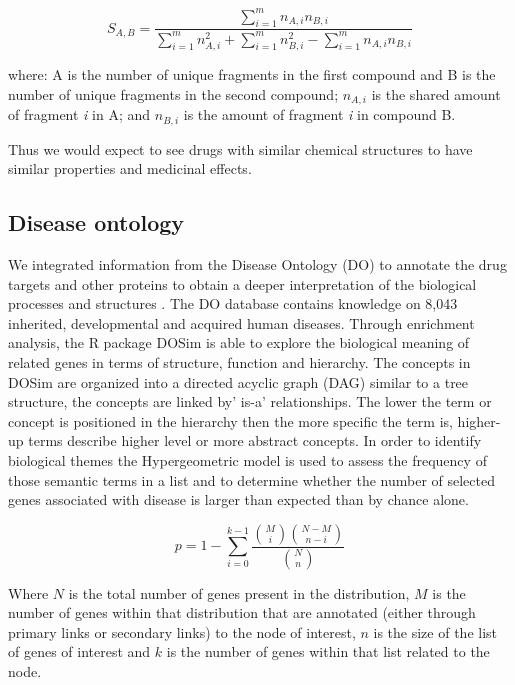 \documentclass[preprint,11pt]{elsarticle}
\begin{document}
\begin{equation}\label{tanimoto}
     S_{A,B}  =  \frac{\sum\limits_{i=1}^m n_{A,i} n_{B,i}}{\sum\limits_{i=1}^m  n_{A,i}^2+ \sum\limits_{i=1}^m n_{B,i}^2 - \sum\limits_{i=1}^m n_{A,i} n_{B,i}}  
\end{equation}

where: A is the number of unique fragments in the first compound and B is the number of unique fragments in the second compound; $ n_{A,i} $ is the shared amount of fragment  {\it i} in A; and $ n_{B,i} $ is the amount of fragment {\it i} in compound B.

Thus we would expect to see drugs with similar chemical structures to have similar properties and medicinal effects.

\subsection{Disease ontology}
We integrated information from the Disease Ontology (DO)   to annotate the drug targets and other proteins to obtain a deeper interpretation of the biological processes and structures \cite{Yu2010,Jiang2011,Schriml2012}. The DO database contains knowledge on 8,043 inherited, developmental and acquired human diseases. Through enrichment analysis, the R package  DOSim is able to explore the biological meaning of related genes in terms of structure, function and hierarchy. The concepts in DOSim are organized into a directed acyclic graph (DAG) similar to a tree structure, the concepts are linked by' is-a' relationships. The lower the term or concept is positioned in the hierarchy then the more specific the term is, higher-up terms describe higher level or more abstract concepts. In order to identify biological themes the Hypergeometric model is used to assess the frequency of those semantic terms
in a list and to determine whether the number of selected genes associated with disease is larger than expected than by chance alone.

\begin{equation}
        p = 1 - \displaystyle\sum_{i = 0}^{k-1}\frac{{M \choose i}{{N-M} \choose {n-i}}} {{N \choose n}}
\label{doe}
\end{equation}

Where $N$ is the total number of genes present in the distribution, $M$ is the number of genes within that distribution that are annotated (either through primary links or secondary links) to the node of interest, $n$ is the size of the list of genes of interest and $k$ is the number of genes within that list related to the node. 
\end{document}
